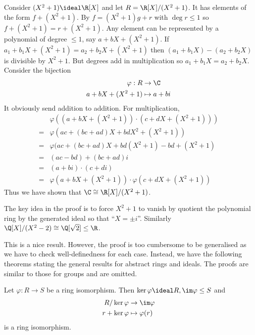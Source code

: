 \documentclass[a4paper]{article}
\theoremstyle{definition}
\begin{document}
\begin{eg}
  Consider \((X^2 + 1) \ideal \R[X]\) and let \(R = \R[X]/(X^2 + 1)\). It has elements of the form \(f + (X^2 + 1)\). By  \(f = (X^2 + 1)g + r\) with \(\deg r \leq 1\) so \(f + (X^2 + 1) = r + (X^2 + 1)\). Any element can be represented by a polynomial of degree \(\leq 1\), say \(a + bX + (X^2 + 1)\). If \(a_1 + b_1X + (X^2 + 1) = a_2 + b_2X + (X^2 + 1)\) then \((a_1 + b_1X) - (a_2 + b_2X)\) is divisible by \(X^2 + 1\). But degrees add in multiplication so \(a_1 + b_1X = a_2 + b_2X\). Consider the bijection
  \begin{align*}
    \varphi: R &\to \C \\
    a + bX + (X^2 + 1) &\mapsto a + bi
  \end{align*}
  It obviously send addition to addition. For multiplication,
  \begin{align*}
    &\varphi((a + bX + (X^2 + 1)) \cdot (c + dX + (X^2 + 1))) \\
    =& \varphi(ac + (bc + ad)X + bdX^2 + (X^2 + 1)) \\
    =& \varphi(ac + (bc + ad)X + bd(X^2 + 1) - bd + (X^2 + 1) \\
    =& (ac - bd) + (bc + ad)i \\
    =& (a + bi) \cdot (c + di) \\
    =& \varphi(a + bX + (X^2 + 1)) \cdot \varphi(c + dX + (X^2 + 1))
  \end{align*}
  Thus we have shown that \(\C \cong \R[X]/(X^2 + 1)\).
\end{eg}

\begin{remark}
  The key idea in the proof is to force \(X^2 + 1\) to vanish by quotient the polynomial ring by the generated ideal so that ``\(X = \pm i\)''. Similarly \(\Q[X]/(X^2 - 2) \cong \Q[\sqrt 2] \leq \R\).
\end{remark}

This is a nice result. However, the proof is too cumbersome to be generalised as we have to check well-definedness for each case. Instead, we have the following theorems stating the general results for abstract rings and ideals. The proofs are similar to those for groups and are omitted.

\begin{theorem}
  Let \(\varphi: R \to S\) be a ring isomorphism. Then \(\ker \varphi \ideal R, \im \varphi \leq S\) and
  \begin{align*}
    R/\ker \varphi &\to \im \varphi \\
    r + \ker \varphi &\mapsto \varphi(r)
  \end{align*}
  is a ring isomorphism.
\end{theorem}
\end{document}
